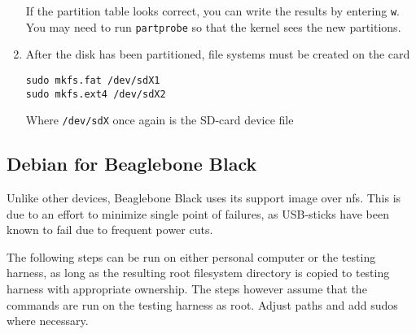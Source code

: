 \documentclass[a4paper,11pt]{article}
\newcommand{\cmd}[1]{\texttt{#1}}
\begin{document}
\begin{enumerate}
If the partition table looks correct, you can write the results by entering \cmd{w}. You may need to run \cmd{partprobe} so that the kernel sees the new partitions.

\item After the disk has been partitioned, file systems must be created on the card

\begin{lstlisting}
sudo mkfs.fat /dev/sdX1
sudo mkfs.ext4 /dev/sdX2
\end{lstlisting}

Where \cmd{/dev/sdX} once again is the SD-card device file
\end{enumerate}

\subsection{Debian for Beaglebone Black}

Unlike other devices, Beaglebone Black uses its support image over nfs. This is due to an effort to minimize single point of failures, as USB-sticks have been known to fail due to frequent power cuts.

The following steps can be run on either personal computer or the testing harness, as long as the resulting root filesystem directory is copied to testing harness with appropriate ownership. The steps however assume that the commands are run on the testing harness as root. Adjust paths and add sudos where necessary.
\end{document}
